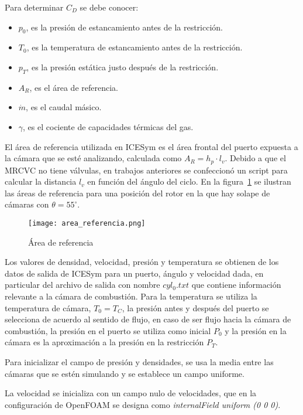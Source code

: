 Para determinar $C_D$ se debe conocer:

\begin{itemize}
    \item $p_0$, es la presión de estancamiento antes de la restricción.
    \item $T_0$, es la temperatura de estancamiento antes de la restricción.
    \item $p_T$, es la presión estática justo después de la restricción.
    \item $A_R$, es el área de referencia.
    \item $\dot{m}$, es el caudal másico.
    \item $\gamma$, es el cociente de capacidades térmicas del gas.
\end{itemize}

El área de referencia utilizada en ICESym es el área frontal del puerto expuesta
a la cámara que se esté analizando, calculada como $A_{R} = h_{p} \cdot l_{{v}}$.
%
Debido a que el MRCVC no tiene válvulas, en trabajos anteriores se confeccionó
un script para calcular la distancia $l_v$ en función del ángulo del ciclo.
%
En la figura~\ref{fig:area_referencia} se ilustran las áreas de referencia para
una posición del rotor en la que hay solape de cámaras con $\theta = 55^\circ$.

\begin{figure}
    \centering
    \texttt{[image: area\_referencia.png]}
    \caption{Área de referencia}\label{fig:area_referencia}
\end{figure}

Los valores de densidad, velocidad, presión y temperatura se obtienen de los
datos de salida de ICESym para un puerto, ángulo y velocidad dada, en
particular del archivo de salida con nombre \emph{$cyl_0.txt$} que contiene
información relevante a la cámara de combustión.
%
Para la temperatura se utiliza la temperatura de cámara, $T_0 = T_C$, la
presión antes y después del puerto se selecciona de acuerdo al sentido de
flujo, en caso de ser flujo hacia la cámara de combustión, la presión en el
puerto se utiliza como inicial $P_0$ y la presión en la cámara es la
aproximación a la presión en la restricción $P_T$.

Para inicializar el campo de presión y densidades, se usa la media entre las
cámaras que se estén simulando y se establece un campo uniforme.

La velocidad se inicializa con un campo nulo de velocidades, que en la
configuración de OpenFOAM se designa como \emph{internalField uniform (0 0 0)}.

